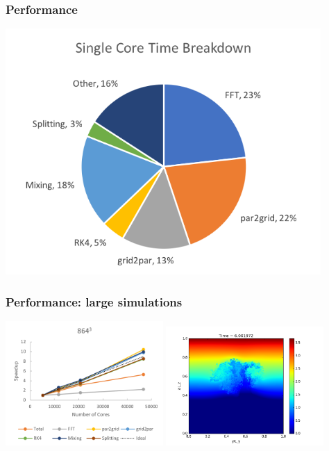 \documentclass{beamer}
\begin{document}
\begin{frame}
\frametitle{Performance}

\includegraphics[width=0.90\textwidth]{pmpic_images/pie.png} 

\end{frame}

\begin{frame}
\frametitle{Performance: large simulations}

\includegraphics[width=0.45\textwidth]{pmpic_images/864.png} 
\includegraphics[width=0.45\textwidth]{pmpic_images/6.png} 

\end{frame}
\end{document}
